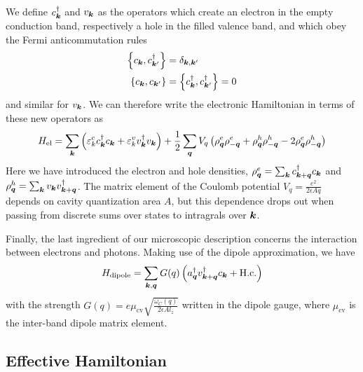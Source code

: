We define $c_{\bm{k}}^{\dagger}$ and $v_{\bm{k}}$ as the operators which
create an electron in the empty conduction band, respectively a hole
in the filled valence band, and which obey the Fermi anticommutation
rules
\begin{align}
  \left\{c_{\bm{k}}, c_{\bm{k}^{\prime}}^{\dagger}\right\} & =\delta_{\bm{k},\bm{k}^{\prime}}\\
  \left\{c_{\bm{k}}, c_{\bm{k}^{\prime}}\right\} & = \left\{c_{\bm{k}}^{\dagger}, c_{\bm{k}^{\prime}}^{\dagger}\right\} = 0
\end{align}
and similar for $v_{\bm{k}}$. We can therefore write the electronic
Hamiltonian in terms of these new operators as~\cite{Keeling_2007}
%
\begin{equation}\label{eq:coulomb-hamiltonian}
  H_{\text{el}} = \sum_{\bm{k}} \left( \varepsilon^c_k c_{\bm{k}}^{\dagger} c_{\bm{k}} + \varepsilon^v_k v_{\bm{k}}^{\dagger} v_{\bm{k}} \right) + \frac{1}{2}\sum_{\bm{q}} V_q \left( \rho^e_{\bm{q}} \rho^e_{-\bm{q}} + \rho^h_{\bm{q}} \rho^h_{-\bm{q}} -2 \rho^e_{\bm{q}} \rho^h_{-\bm{q}}\right)
\end{equation}
% 
Here we have introduced the electron and hole densities,
$\rho^e_{\bm{q}} = \sum_{\bm{k}} c_{\bm{k} + \bm{q}}^{\dagger} c_{\bm{k}}$ and
$\rho^h_{\bm{q}} = \sum_{\bm{k}} v_{\bm{k}} v_{\bm{k} + \bm{q}}^{\dagger}$. The
matrix element of the Coulomb potential
$V_q = \frac{e^2}{2 \epsilon A q}$ depends on cavity quantization area
$A$, but this dependence drops out when passing from discrete sums
over states to intragrals over $\bm{k}$.

Finally, the last ingredient of our microscopic description concerns
the interaction between electrons and photons. Making use of the
dipole approximation, we have
%
\begin{equation}\label{eq:dipolar-inter}
  H_{\text{dipole}} = \sum_{\bm{k}, \bm{q}} G(q) \left( a_{\bm{q}}^{\dagger} v_{\bm{k} + \bm{q}}^{\dagger} c_{\bm{k}} + \text{H.c.}\right)
\end{equation}
% 
with the strength
$G(q) = e \mu_{\text{cv}}\sqrt{\frac{\omega_C(q)}{2\epsilon A l_z}}$
written in the dipole gauge, where $\mu_{\text{cv}}$ is the inter-band
dipole matrix element.


\subsection{Effective Hamiltonian}
\label{subsec:effective}


